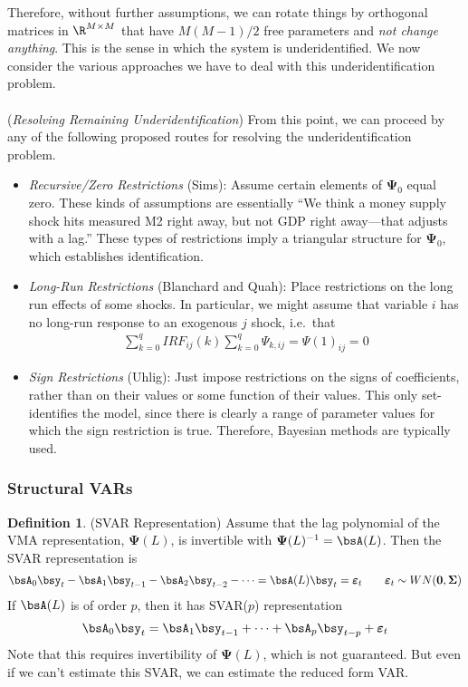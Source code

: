 \documentclass[12pt]{article}
\theoremstyle{plain}
\theoremstyle{definition}
\newtheorem{defn}[thm]{Definition}
\theoremstyle{remark}
\newcommand{\bsSigma}{\boldsymbol{\Sigma}}
\newcommand{\bsvarepsilon}{\boldsymbol{\varepsilon}}
\newcommand{\bsPsi}{\boldsymbol{\Psi}}
\renewcommand{\bso}{\boldsymbol{0}}
\begin{document}
Therefore, without further assumptions, we can rotate things by
orthogonal matrices in $\R^{M\times M}$ that have $M(M-1)/2$ free
parameters and \emph{not change anything}. This is the sense in which
the system is underidentified. We now consider the various approaches we
have to deal with this underidentification problem.
\\
\\
(\emph{Resolving Remaining Underidentification})
From this point, we can proceed by any of the following proposed routes
for resolving the underidentification problem.
\begin{itemize}
  \item \emph{Recursive/Zero Restrictions} (Sims):
    Assume certain elements of $\bsPsi_0$ equal zero. These kinds of
    assumptions are essentially ``We think a money supply shock hits
    measured M2 right away, but not GDP right away---that adjusts with a
    lag.'' These types of restrictions imply a triangular structure for
    $\bsPsi_0$, which establishes identification.
  \item \emph{Long-Run Restrictions} (Blanchard and Quah): Place
    restrictions on the long run effects of some shocks. In particular,
    we might assume that variable $i$ has no long-run response to an
    exogenous $j$ shock, i.e.\ that
    \begin{align*}
      \sum_{k=0}^q IRF_{ij}(k)
      \sum_{k=0}^q \Psi_{k,ij}
      = \Psi(1)_{ij}
      = 0
    \end{align*}
  \item \emph{Sign Restrictions} (Uhlig): Just impose restrictions on
    the signs of coefficients, rather than on their values or some
    function of their values. This only set-identifies the model, since
    there is clearly a range of parameter values for which the sign
    restriction is true. Therefore, Bayesian methods are typically used.
\end{itemize}


\clearpage
\subsubsection{Structural VARs}

\begin{defn}(SVAR Representation)
Assume that the lag polynomial of the VMA representation, $\bsPsi(L)$,
is invertible with $\bsPsi(L)^{-1}=\bsA(L)$. Then the SVAR
representation is
\begin{align*}
  \bsA_0\bsy_t
  - \bsA_1\bsy_{t-1}
  - \bsA_2\bsy_{t-2}
  - \cdots
  = \bsA(L)\bsy_t
  = \bsvarepsilon_t
  \qquad \bsvarepsilon_t \sim WN(\bso,\bsSigma)
\end{align*}
If $\bsA(L)$ is of order $p$, then it has SVAR($p$) representation
\begin{align}
  \bsA_0\bsy_t
  =
  \bsA_1\bsy_{t-1}
  + \cdots
  + \bsA_p\bsy_{t-p}
  + \bsvarepsilon_t
  \label{svarp}
\end{align}
Note that this requires invertibility of $\bsPsi(L)$, which is not
guaranteed. But even if we can't estimate this SVAR, we can estimate
the reduced form VAR.
\end{defn}
\end{document}
